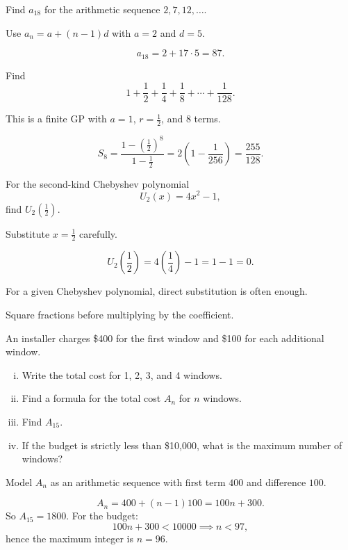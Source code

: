 \begin{problem}
Find $a_{18}$ for the arithmetic sequence $2,7,12,\ldots$.
\end{problem}
\begin{hint}
Use $a_n=a+(n-1)d$ with $a=2$ and $d=5$.
\end{hint}
\begin{solution}
\[
a_{18}=2+17\cdot 5=87.
\]
\end{solution}

\begin{problem}
Find
\[
1+\frac12+\frac14+\frac18+\cdots+\frac1{128}.
\]
\end{problem}
\begin{hint}
This is a finite GP with $a=1$, $r=\frac12$, and $8$ terms.
\end{hint}
\begin{solution}
\[
S_8=\frac{1-(\frac12)^8}{1-\frac12}=2\left(1-\frac1{256}\right)=\frac{255}{128}.
\]
\end{solution}

\begin{problem}
For the second-kind Chebyshev polynomial
\[
U_2(x)=4x^2-1,
\]
find $U_2\left(\frac12\right)$.
\end{problem}
\begin{hint}
Substitute $x=\frac12$ carefully.
\end{hint}
\begin{solution}
\[
U_2\left(\frac12\right)=4\left(\frac14\right)-1=1-1=0.
\]
\end{solution}
\begin{takeaways}
\item For a given Chebyshev polynomial, direct substitution is often enough.
\item Square fractions before multiplying by the coefficient.
\end{takeaways}

\begin{problem}
An installer charges \$400 for the first window and \$100 for each additional window.
\begin{enumerate}[(i)]
\item Write the total cost for 1, 2, 3, and 4 windows.
\item Find a formula for the total cost $A_n$ for $n$ windows.
\item Find $A_{15}$.
\item If the budget is strictly less than \$10,000, what is the maximum number of windows?
\end{enumerate}
\end{problem}
\begin{hint}
Model $A_n$ as an arithmetic sequence with first term $400$ and difference $100$.
\end{hint}
\begin{solution}
\[
A_n=400+(n-1)100=100n+300.
\]
So $A_{15}=1800$. For the budget:
\[
100n+300<10000 \implies n<97,
\]
hence the maximum integer is $n=96$.
\end{solution}

